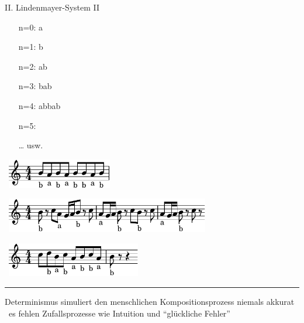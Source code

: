 \begin{frame}{II. \dimTwoTitle}{Lindenmayer-System II}
	\parbox{.25\textwidth}{
		\begin{itemize}
			\scriptsize
			\item[n=0:] a
			\item[n=1:] b
			\item[n=2:] ab
			\item[n=3:] bab
			\item[n=4:] abbab
			\item[n=5:] 
			\item[\dots] usw.
		\end{itemize}
	}
	\parbox{.6\textwidth}{
		~\includegraphics[height=1.3cm]{lily/LSystem_1.pdf}
		
		\medskip
		~\includegraphics[height=1.5cm]{lily/LSystem_2.pdf}
		
		\medskip
		~\includegraphics[height=1.5cm]{lily/LSystem_3.pdf}
	}

	\bigskip
	\hrule
	\bigskip
	Determinismus simuliert den menschlichen Kompositionsprozess niemals akkurat\\
	\hfill\conclude~es fehlen Zufallsprozesse wie Intuition und \enquote{glückliche Fehler}
\end{frame}

